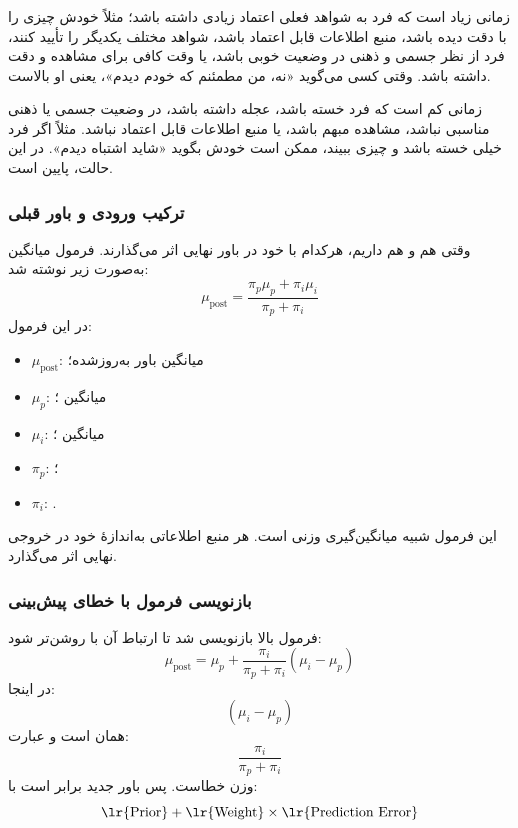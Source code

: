 \subsubsection{}
 زمانی زیاد است که فرد به شواهد فعلی اعتماد زیادی داشته باشد؛ مثلاً خودش چیزی را با دقت دیده باشد، منبع اطلاعات قابل اعتماد باشد، شواهد مختلف یکدیگر را تأیید کنند، فرد از نظر جسمی و ذهنی در وضعیت خوبی باشد، یا وقت کافی برای مشاهده و دقت داشته باشد. وقتی کسی می‌گوید «نه، من مطمئنم که خودم دیدم»، یعنی  او بالاست.

 زمانی کم است که فرد خسته باشد، عجله داشته باشد، در وضعیت جسمی یا ذهنی مناسبی نباشد، مشاهده مبهم باشد، یا منبع اطلاعات قابل اعتماد نباشد. مثلاً اگر فرد خیلی خسته باشد و چیزی ببیند، ممکن است خودش بگوید «شاید اشتباه دیدم». در این حالت،  پایین است.

\subsubsection{ترکیب ورودی و باور قبلی}
وقتی هم  و هم  داریم، هرکدام با  خود در باور نهایی اثر می‌گذارند. فرمول میانگین  به‌صورت زیر نوشته شد:
\[
\mu_{\mathrm{post}}=
\frac{\pi_p \mu_p+\pi_i \mu_i}{\pi_p+\pi_i}
\]
در این فرمول:
\begin{itemize}
  \item \(\mu_{\mathrm{post}}\): میانگین باور به‌روزشده؛
  \item \(\mu_p\): میانگین ؛
  \item \(\mu_i\): میانگین ؛
  \item \(\pi_p\): ؛
  \item \(\pi_i\): .
\end{itemize}

این فرمول شبیه میانگین‌گیری وزنی است. هر منبع اطلاعاتی به‌اندازهٔ  خود در خروجی نهایی اثر می‌گذارد.

\subsubsection{بازنویسی فرمول با خطای پیش‌بینی}
فرمول بالا بازنویسی شد تا ارتباط آن با  روشن‌تر شود:
\[
\mu_{\mathrm{post}}=
\mu_p+\frac{\pi_i}{\pi_p+\pi_i}(\mu_i-\mu_p)
\]
در اینجا:
\[
(\mu_i-\mu_p)
\]
همان  است و عبارت:
\[
\frac{\pi_i}{\pi_p+\pi_i}
\]
وزن خطاست. پس باور جدید برابر است با:
\[
\text{\lr{Prior}}+\text{\lr{Weight}}\times \text{\lr{Prediction Error}}
\]

